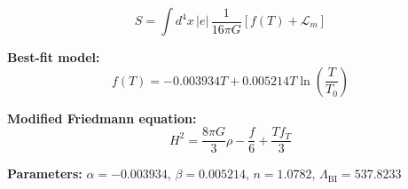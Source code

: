 
\begin{equation}
  S = \int d^4x \, |e| \, \frac{1}{16\pi G} \left[ f(T) + \mathcal{L}_m \right]
\end{equation}

\textbf{Best-fit model:}
\begin{equation}
  f(T) = -0.003934 T + 0.005214 T \ln\!\left(\frac{T}{T_0}\right)
\end{equation}

\textbf{Modified Friedmann equation:}
\begin{equation}
  H^2 = \frac{8\pi G}{3} \rho - \frac{f}{6} + \frac{T f_T}{3}
\end{equation}

\textbf{Parameters:}
$\alpha = -0.003934$, \quad
$\beta = 0.005214$, \quad
$n = 1.0782$, \quad
$\Lambda_{\text{BI}} = 537.8233$